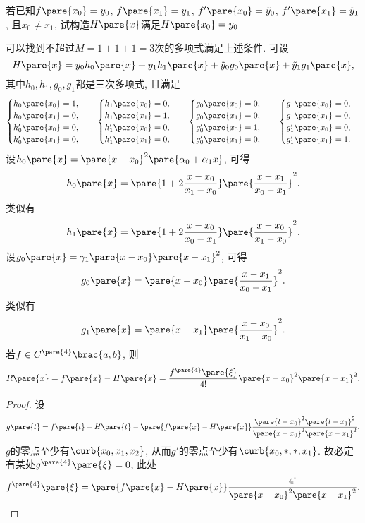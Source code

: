 \documentclass[hidelinks]{ctexart}
\begin{document}
若已知$f\pare{x_0} = y_0$, $f\pare{x_1} = y_1$, $f'\pare{x_0} = \tilde{y}_0$, $f'\pare{x_1} = \tilde{y}_1$, 且$x_0 \neq x_1$, 试构造$H\pare{x}$满足$H\pare{x_0} = y_0$
\par
可以找到不超过$M = 1+1+1 = 3$次的多项式满足上述条件. 可设
\[ H\pare{x} = y_0 h_0\pare{x} + y_1 h_1\pare{x} + \tilde{y}_0 g_0\pare{x} + \tilde{y}_1 g_1\pare{x}, \]
其中$h_0, h_1, g_0, g_1$都是三次多项式, 且满足
\[ \begin{cases}
    h_0 \pare{x_0} = 1, \\
    h_0 \pare{x_1} = 0, \\
    h'_0 \pare{x_0} = 0, \\
    h'_0 \pare{x_1} = 0,
\end{cases}\quad \begin{cases}
    h_1 \pare{x_0} = 0, \\
    h_1 \pare{x_1} = 1, \\
    h'_1 \pare{x_0} = 0, \\
    h'_1 \pare{x_1} = 0,
\end{cases}\quad \begin{cases}
    g_0 \pare{x_0} = 0, \\
    g_0 \pare{x_1} = 0, \\
    g'_0 \pare{x_0} = 1, \\
    g'_0 \pare{x_1} = 0,
\end{cases}\quad \begin{cases}
    g_1 \pare{x_0} = 0, \\
    g_1 \pare{x_1} = 0, \\
    g'_1 \pare{x_0} = 0, \\
    g'_1 \pare{x_1} = 1.
\end{cases} \]
设$\displaystyle h_0\pare{x} = \pare{x-x_0}^2 \pare{\alpha_0 + \alpha_1 x}$, 可得
\[ h_0\pare{x} = \pare{1+2\frac{x-x_0}{x_1-x_0}}\pare{\frac{x-x_1}{x_0-x_1}}^2. \]
类似有
\[ h_1\pare{x} = \pare{1+2\frac{x-x_0}{x_0-x_1}}\pare{\frac{x-x_0}{x_1-x_0}}^2. \]
设$g_0\pare{x} = \gamma_1 \pare{x-x_0}\pare{x-x_1}^2$, 可得
\[ g_0\pare{x} = \pare{x-x_0}\pare{\frac{x-x_1}{x_0-x_1}}^2. \]
类似有
\[ g_1\pare{x} = \pare{x-x_1}\pare{\frac{x-x_0}{x_1-x_0}}^2. \]
若$f\in C^{\pare{4}}\brac{a,b}$, 则
\[ R\pare{x} = f\pare{x} - H\pare{x} = \frac{f^{\pare{4}}\pare{\xi}}{4!}\pare{x-x_0}^2\pare{x-x_1}^2. \]
\begin{proof}
    设
    \[ g\pare{t} = f\pare{t} - H\pare{t} - \pare{f\pare{x} - H\pare{x}} \frac{\pare{t-x_0}^2\pare{t-x_1}^2}{\pare{x-x_0}^2\pare{x-x_1}^2}. \]
    $g$的零点至少有$\curb{x_0,x_1,x_2}$, 从而$g'$的零点至少有$\curb{x_0,*,*,x_1}$. 故必定有某处$g^{\pare{4}}\pare{\xi} = 0$, 此处
    \[ f^{\pare{4}}\pare{\xi} = \pare{f\pare{x} - H\pare{x}}\frac{4!}{\pare{x-x_0}^2\pare{x-x_1}^2}. \qedhere \]
\end{proof}
\end{document}
